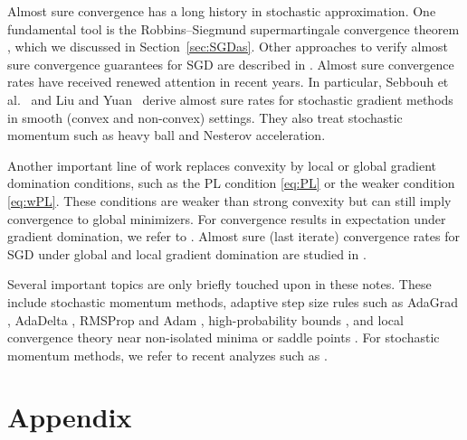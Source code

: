 \documentclass[12pt,openany]{book}
\theoremstyle{definition}
\theoremstyle{definition}
\begin{document}
Almost sure convergence has a long history in stochastic approximation. One fundamental tool is the Robbins--Siegmund supermartingale convergence theorem \cite{RS1971}, which we discussed in Section~\ref{sec:SGDas}. Other approaches to verify almost sure convergence guarantees for SGD are described in \cite{Bertsekas_2000,Blum1954,chouzenoux2023kurdykalojasiewicz,dereich2021convergence,Nguyen2018,mertikopoulos2020sure}. Almost sure convergence rates have received renewed attention in recent years. In particular, Sebbouh et al.~\cite{pmlr-v134-sebbouh21a} and Liu and Yuan~\cite{LY2022} derive almost sure rates for stochastic gradient methods in smooth (convex and non-convex) settings. They also treat stochastic momentum such as heavy ball and Nesterov acceleration.

Another important line of work replaces convexity by local or global gradient domination conditions, such as the PL condition \eqref{eq:PL} or the weaker condition \eqref{eq:wPL}. These conditions are weaker than strong convexity but can still imply convergence to global minimizers. For convergence results in expectation under gradient domination, we refer to
\cite{fatkhullin2022,pmlr-v134-fontaine21a,10.1007/978-3-319-46128-1_50,khaled2022better}. 
Almost sure (last iterate) convergence rates for SGD under global and local gradient domination are studied in \cite{weissmann2025almost}.

Several important topics are only briefly touched upon in these notes. These include stochastic
momentum methods, adaptive step size rules such as AdaGrad \cite{JMLR:v12:duchi11a}, AdaDelta \cite{zeiler2012adadeltaadaptivelearningrate}, RMSProp \cite{tieleman2012rmsprop} and Adam \cite{kingma2014adam}, high-probability bounds \cite{liu23},
and local convergence theory near non-isolated minima or saddle points \cite{mertikopoulos2020sure}. For stochastic momentum
methods, we refer to recent analyzes such as \cite{gadat16,gess2023convergence,LY2022,mai2020convergence,pmlr-v134-sebbouh21a}.





\appendix

\chapter{Appendix}
\end{document}
